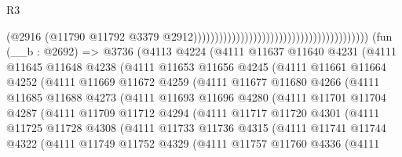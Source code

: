 \begin{lexlean}{R3}
\begin{coremodule}
                                                                                  (@2916
                                                                                    (@11790
                                                                                      @11792
                                                                                      @3379
                                                                                      @2912)))))))))))))))))))))))))))))))))))))))))
    (fun (__b : @2692) =>
    @3736
      (@4113
        @4224
        (@4111
          @11637
          @11640
          @4231
          (@4111
            @11645
            @11648
            @4238
            (@4111
              @11653
              @11656
              @4245
              (@4111
                @11661
                @11664
                @4252
                (@4111
                  @11669
                  @11672
                  @4259
                  (@4111
                    @11677
                    @11680
                    @4266
                    (@4111
                      @11685
                      @11688
                      @4273
                      (@4111
                        @11693
                        @11696
                        @4280
                        (@4111
                          @11701
                          @11704
                          @4287
                          (@4111
                            @11709
                            @11712
                            @4294
                            (@4111
                              @11717
                              @11720
                              @4301
                              (@4111
                                @11725
                                @11728
                                @4308
                                (@4111
                                  @11733
                                  @11736
                                  @4315
                                  (@4111
                                    @11741
                                    @11744
                                    @4322
                                    (@4111
                                      @11749
                                      @11752
                                      @4329
                                      (@4111
                                        @11757
                                        @11760
                                        @4336
                                        (@4111

\end{coremodule}
\end{lexlean}
